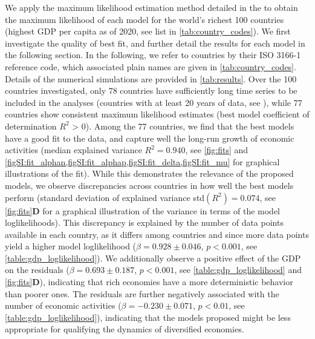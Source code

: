 We apply the maximum likelihood estimation method detailed in the  to obtain the maximum likelihood of each model for the world's richest 100 countries (highest GDP per capita as of 2020, see list in \cref{tab:country_codes}). 
% 
We first investigate the quality of best fit, and further detail the results for each model in the following section. %
% 
In the following, we refer to countries by their ISO 3166-1 reference code, which associated plain names are given in \cref{tab:country_codes}.
% 
Details of the numerical simulations are provided in \cref{tab:results}.
%
Over the 100 countries investigated, only 78 countries have sufficiently long time series to be included in the analyses (countries with at least 20 years of data, see ), while 77 countries show consistent maximum likelihood estimates (best model coefficient of determination $R^2$ > 0).
% 
Among the 77 countries, we find that the best models have a good fit to the data, and capture well the long-run growth of economic activities (median explained variance $R^2 = 0.940$, see \cref{fig:fits} and \cref{figSI:fit_alphan,figSI:fit_alphap,figSI:fit_delta,figSI:fit_mu} for graphical illustrations of the fit).
% 
While this demonstrates the relevance of the proposed models, we observe discrepancies across countries in how well the best models perform (standard deviation of explained variance std$(R^2)= 0.074$, see \cref{fig:fits}\textbf{D} for a graphical illustration of the variance in terms of the model loglikelihoods).
% 
% 
This discrepancy is explained by the number of data points available in each country, as it differs among countries and since more data points yield a higher model loglikelihood ($\beta = 0.928 \pm 0.046$, $p<0.001$, see \cref{table:gdp_loglikelihood}).
% 
We additionally observe a positive effect of the GDP on the residuals ($\beta = 0.693 \pm 0.187$, $p<0.001$, see \cref{table:gdp_loglikelihood} and \cref{fig:fits}\textbf{D}), indicating that rich economies have a more deterministic behavior than poorer ones. The residuals are further negatively associated with the number of economic activities ($\beta = -0.230 \pm 0.071$, $p<0.01$, see \cref{table:gdp_loglikelihood}), indicating that the models proposed might be less appropriate for qualifying the dynamics of diversified economies.
% 
% 

